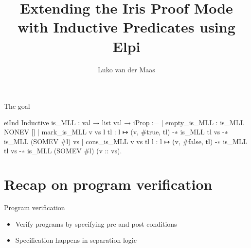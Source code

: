 \documentclass[aspectratio=169]{beamer}
\title{Extending the Iris Proof Mode with Inductive Predicates using Elpi}
\author{Luko van der Maas}
\institute{Computing Science\\Radboud University}
\date{}
\begin{document}
\frame{\titlepage}

\begin{frame}[fragile]{The goal}
    \begin{center}
    \end{center}

    \begin{coqcode}
        eiInd
        Inductive is_MLL : val → list val → iProp :=
            | empty_is_MLL : is_MLL NONEV []
            | mark_is_MLL v vs l tl : 
              l ↦ (v, #true, tl) -∗ is_MLL tl vs -∗ 
              is_MLL (SOMEV #l) vs
            | cons_is_MLL v vs tl l : 
              l ↦ (v, #false, tl) -∗ is_MLL tl vs -∗ 
              is_MLL (SOMEV #l) (v :: vs).
      \end{coqcode}

\end{frame}

\section{Recap on program verification}

\begin{frame}{Program verification}
    \begin{itemize}
        \item Verify programs by specifying pre and post conditions
        \item Specification happens in separation logic
    \end{itemize}
\end{frame}
\end{document}
